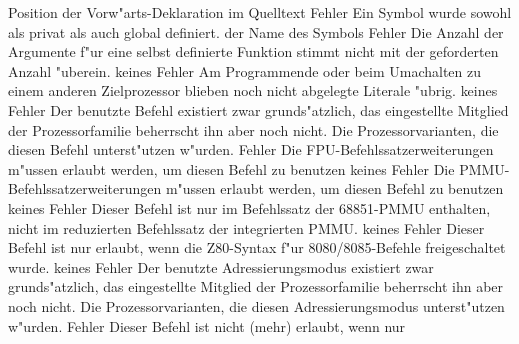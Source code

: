 \documentclass[12pt,a4paper,twoside]{report}
\begin{document}
\begin{description}
{                Position der Vorw"arts-Deklaration im Quelltext}
               {Fehler}
               {Ein Symbol wurde sowohl als privat als auch
                global definiert.}
               {der Name des Symbols}
               {Fehler}
               {Die Anzahl der Argumente f"ur eine
                selbst definierte Funktion stimmt nicht mit der geforderten
                Anzahl "uberein.}
               {keines}
               {Fehler}
               {Am Programmende oder beim Umachalten
                zu einem anderen Zielprozessor blieben noch nicht
                abgelegte Literale "ubrig.}
               {keines}
               {Fehler}
               {Der benutzte Befehl existiert zwar
                grunds"atzlich, das eingestellte Mitglied der
                Prozessorfamilie beherrscht ihn aber noch nicht.}
               {Die Prozessorvarianten, die diesen Befehl
                unterst"utzen w"urden.}
               {Fehler}
               {Die FPU-Befehlssatzerweiterungen m"ussen erlaubt
                werden, um diesen Befehl zu benutzen}
               {keines}
               {Fehler}
               {Die PMMU-Befehlssatzerweiterungen m"ussen erlaubt
                werden, um diesen Befehl zu benutzen}
               {keines}
               {Fehler}
               {Dieser Befehl ist nur im Befehlssatz der 
                68851-PMMU enthalten, nicht im reduzierten
                Befehlssatz der integrierten PMMU.}
               {keines}
               {Fehler}
               {Dieser Befehl ist nur erlaubt, wenn die
                Z80-Syntax f"ur 8080/8085-Befehle freigeschaltet
                wurde.}
               {keines}
               {Fehler}
               {Der benutzte Adressierungsmodus existiert
                zwar grunds"atzlich, das eingestellte Mitglied der
                Prozessorfamilie beherrscht ihn aber noch nicht.}
               {Die Prozessorvarianten, die diesen
                Adressierungsmodus unterst"utzen w"urden.}
               {Fehler}
               {Dieser Befehl ist nicht (mehr) erlaubt, wenn nur
}
\end{description}
\end{document}
